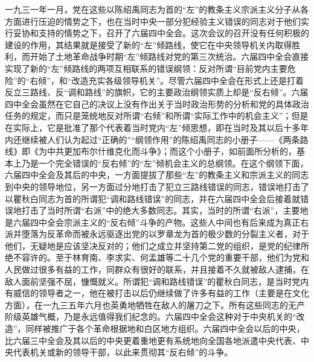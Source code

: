 一九三一年一月，党在这些以陈绍禹同志为首的“左”的教条主义宗派主义分子从各方面进行压迫的情势之下，也在当时中央一部分犯经验主义错误的同志对于他们实行妥协和支持的情势之下，召开了六届四中全会。这次会议的召开没有任何积极的建设的作用，其结果就是接受了新的“左”倾路线，使它在中央领导机关内取得胜利，而开始了土地革命战争时期“左”倾路线对党的第三次统治。六届四中全会直接实现了新的“左”倾路线的两项互相联系的错误纲领：反对所谓“目前党内主要危险”的“右倾”，和“改造充实各级领导机关”。尽管六届四中全会在形式上还是打着反立三路线、反“调和路线”的旗帜，它的主要政治纲领实质上却是“反右倾”。六届四中全会虽然在它自己的决议上没有作出关于当时政治形势的分析和党的具体政治任务的规定，而只是笼统地反对所谓“右倾”和所谓“实际工作中的机会主义”；但是在实际上，它是批准了那个代表着当时党内“左”倾思想，即在当时及其以后十多年内还继续被人们认为起过“正确的”“纲领作用”的陈绍禹同志的小册子——《两条路线》即《为中共更加布尔什维克化而斗争》；而这个小册子，如前面所分析的，基本上乃是一个完全错误的“反右倾”的“左”倾机会主义的总纲领。在这个纲领下面，六届四中全会及其后的中央，一方面提拔了那些“左”的教条主义和宗派主义的同志到中央的领导地位，另一方面过分地打击了犯立三路线错误的同志，错误地打击了以瞿秋白同志为首的所谓犯“调和路线错误”的同志，并在六届四中全会后接着就错误地打击了当时所谓“右派”中的绝大多数同志。其实，当时的所谓“右派”，主要地是六届四中全会宗派主义的“反右倾”斗争的产物。这些人中间也有后来成为真正右派并堕落为反革命而被永远驱逐出党的以罗章龙为首的极少数的分裂主义者，对于他们，无疑地是应该坚决反对的；他们之成立并坚持第二党的组织，是党的纪律所绝不容许的。至于林育南、李求实、何孟雄等二十几个党的重要干部，他们为党和人民做过很多有益的工作，同群众有很好的联系，并且接着不久就被敌人逮捕，在敌人面前坚强不屈，慷慨就义。所谓犯“调和路线错误”的瞿秋白同志，是当时党内有威信的领导者之一，他在被打击以后仍继续做了许多有益的工作（主要是在文化方面），在一九三五年六月也英勇地牺牲在敌人的屠刀之下。所有这些同志的无产阶级英雄气概，乃是永远值得我们纪念的。六届四中全会这种对于中央机关的“改造”，同样被推广于各个革命根据地和白区地方组织。六届四中全会以后的中央，比六届三中全会及其以后的中央更着重地更有系统地向全国各地派遣中央代表、中央代表机关或新的领导干部，以此来贯彻其“反右倾”的斗争。

